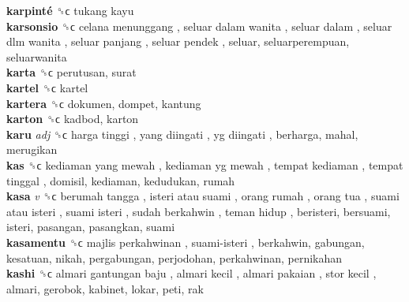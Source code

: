 \textbf{karpinté} ␝ϲ   tukang kayu   \\
\textbf{karsonsio} ␝ϲ   celana menunggang ,  seluar dalam wanita ,  seluar dalam ,  seluar dlm wanita ,  seluar panjang ,  seluar pendek , seluar, seluarperempuan, seluarwanita  \\
\textbf{karta} ␝ϲ  perutusan, surat  \\
\textbf{kartel} ␝ϲ  kartel  \\
\textbf{kartera} ␝ϲ  dokumen, dompet, kantung  \\
\textbf{karton} ␝ϲ  kadbod, karton  \\
\textbf{karu} \emph{adj}  ␝ϲ   harga tinggi ,  yang diingati ,  yg diingati , berharga, mahal, merugikan  \\
\textbf{kas} ␝ϲ   kediaman yang mewah ,  kediaman yg mewah ,  tempat kediaman ,  tempat tinggal , domisil, kediaman, kedudukan, rumah  \\
\textbf{kasa} \emph{v}  ␝ϲ   berumah tangga ,  isteri atau suami ,  orang rumah ,  orang tua ,  suami atau isteri ,  suami isteri ,  sudah berkahwin ,  teman hidup , beristeri, bersuami, isteri, pasangan, pasangkan, suami  \\
\textbf{kasamentu} ␝ϲ   majlis perkahwinan ,  suami-isteri , berkahwin, gabungan, kesatuan, nikah, pergabungan, perjodohan, perkahwinan, pernikahan  \\
\textbf{kashi} ␝ϲ   almari gantungan baju ,  almari kecil ,  almari pakaian ,  stor kecil , almari, gerobok, kabinet, lokar, peti, rak  \\
